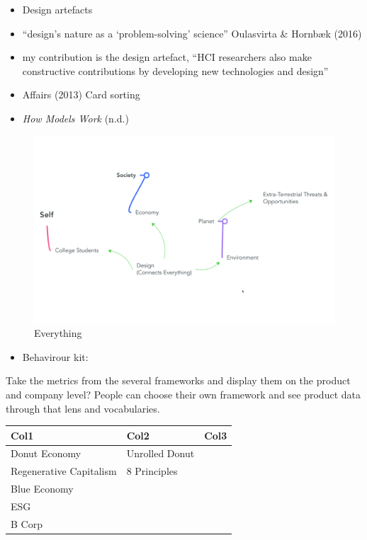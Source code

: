 \documentclass[
  letterpaper,
  DIV=11,
  numbers=noendperiod]{scrartcl}
\providecommand{\tightlist}{%
  \setlength{\itemsep}{0pt}\setlength{\parskip}{0pt}}\usepackage{longtable,booktabs,array}
\begin{document}
\begin{itemize}
\item
  Design artefacts
\item
  ``design's nature as a `problem-solving' science'' Oulasvirta \&
  Hornbæk (2016)
\item
  my contribution is the design artefact, ``HCI researchers also make
  constructive contributions by developing new technologies and design''
\item
  Affairs (2013) Card sorting
\item
  \emph{How {Models Work}} (n.d.)
\end{itemize}

\begin{figure}[H]

{\centering \includegraphics[width=1\linewidth,height=\textheight,keepaspectratio]{./images/discussion/everything.png}

}

\caption{Everything}

\end{figure}%

\begin{itemize}
\tightlist
\item
  Behavirour kit:
\end{itemize}

Take the metrics from the several frameworks and display them on the
product and company level? People can choose their own framework and see
product data through that lens and vocabularies.

\begin{longtable}[]{@{}lll@{}}
\toprule\noalign{}
Col1 & Col2 & Col3 \\
\midrule\noalign{}
\endhead
\bottomrule\noalign{}
\endlastfoot
Donut Economy & Unrolled Donut & \\
Regenerative Capitalism & 8 Principles & \\
Blue Economy & & \\
ESG & & \\
B Corp & & \\
\end{longtable}
\end{document}
